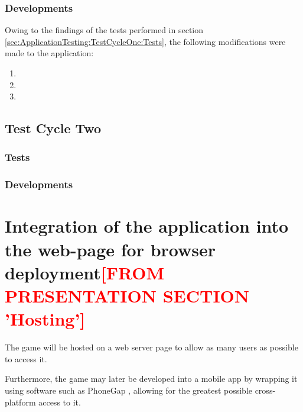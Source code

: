  \subsubsection{Developments}
 \label{sec:ApplicationTesting:TestCycleOne:Developments}
 Owing to the findings of the tests performed in section \ref{sec:ApplicationTesting:TestCycleOne:Tests}, the following modifications were made to the application:
 \begin{enumerate}
 \item
 \item
 \item
 \end{enumerate}
 
 \subsection{Test Cycle Two}
 \label{sec:ApplicationTestinng:TestCycleTwo}
 
 \subsubsection{Tests}
 \label{sec:ApplicationTesting:TestCycleTwo:Tests}
 
 \subsubsection{Developments}
 \label{sec:ApplicationTesting:TestCycleTwo:Developments}
 
 \section{Integration of the application into the web-page for browser deployment\textcolor{red}{[FROM PRESENTATION SECTION 'Hosting']}}
 \label{sec:Methodology:TechnicalOverview:Hosting}
 The game will be hosted on a web server page to allow as many
 users as possible to access it.
 
 Furthermore, the game may later be developed into a mobile app by wrapping it using software such as PhoneGap \cite{PhoneGap}, allowing for the greatest possible cross-platform access to it.